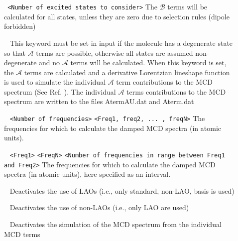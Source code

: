 \begin{description}
\item[] \verb| | \newline
\verb|<Number of excited states to consider>|\newline
The $\mathcal{B}$ terms will be calculated for all states, unless they are zero due to selection rules (dipole forbidden)
\item[] \verb| | \newline
This keyword must be set in input if the molecule has a degenerate state so that $\mathcal{A}$ terms are possible, otherwise all states are assumed non-degenerate and no $\mathcal{A}$ terms will be calculated. When this keyword is set, the $\mathcal{A}$ terms are calculated and a derivative Lorentzian lineshape function is used to simulate the individual $\mathcal{A}$ term contributions to the MCD spectrum (See Ref. \cite{KjaergaardMCD}). The individual $\mathcal{A}$ terms contributions to the MCD spectrum are written to the files AtermAU.dat and Aterm.dat   
\item[] \verb| | \newline
\verb|<Number of frequencies>|\newline
\verb|<Freq1, freq2, ... , freqN>|\newline
The frequencies for which to calculate the damped MCD spectra (in atomic units).
\item[] \verb| | \newline
\verb|<Freq1>|\newline
\verb|<FreqN>|\newline
\verb|<Number of frequencies in range between Freq1 and Freq2>|\newline
The frequencies for which to calculate the damped MCD spectra (in atomic units), here specified as an interval.
\item[] \verb| | \newline
Deactivates the use of LAOs (i.e., only standard, non-LAO, basis is used)
\item[] \verb| | \newline
Deactivates the use of non-LAOs (i.e., only LAO are used)
\item[] \verb| | \newline
Deactivates the simulation of the MCD spectrum from the individual MCD terms
\item[] \verb| | \newline

\end{description}
